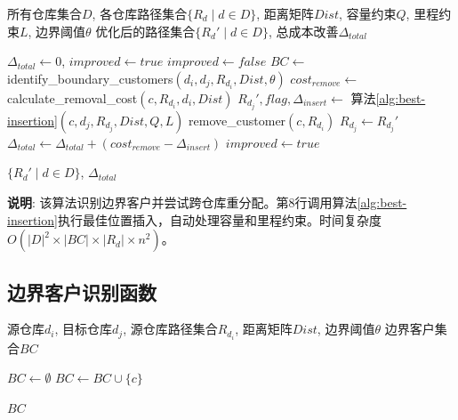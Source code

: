 \documentclass[12pt,a4paper]{article}
\begin{document}
\begin{algorithm}[H]
\caption{边界客户跨仓库重分配}
\label{alg:boundary-reassignment}
\begin{algorithmic}[1]
\REQUIRE 所有仓库集合$D$, 各仓库路径集合$\{R_d \mid d \in D\}$, 距离矩阵$Dist$, 容量约束$Q$, 里程约束$L$, 边界阈值$\theta$
\ENSURE 优化后的路径集合$\{R_d' \mid d \in D\}$, 总成本改善$\Delta_{total}$

\STATE $\Delta_{total} \gets 0$, $improved \gets true$
    \STATE $improved \gets false$
        \STATE $BC \gets$ identify\_boundary\_customers$(d_i, d_j, R_{d_i}, Dist, \theta)$  
            \STATE $cost_{remove} \gets$ calculate\_removal\_cost$(c, R_{d_i}, d_i, Dist)$  
            \STATE $R_{d_j}', flag, \Delta_{insert} \gets$ 算法\ref{alg:best-insertion}$(c, d_j, R_{d_j}, Dist, Q, L)$  
              
                \STATE remove\_customer$(c, R_{d_i})$  
                \STATE $R_{d_j} \gets R_{d_j}'$  
                \STATE $\Delta_{total} \gets \Delta_{total} + (cost_{remove} - \Delta_{insert})$
                \STATE $improved \gets true$
            \ENDIF
        \ENDFOR
    \ENDFOR
\ENDWHILE

\RETURN $\{R_d' \mid d \in D\}$, $\Delta_{total}$
\end{algorithmic}
\end{algorithm}

\textbf{说明}: 该算法识别边界客户并尝试跨仓库重分配。第8行调用算法\ref{alg:best-insertion}执行最佳位置插入，自动处理容量和里程约束。时间复杂度$O(|D|^2 \times |BC| \times |R_d| \times n^2)$。

\subsection{边界客户识别函数}

\begin{algorithm}[H]
\caption{识别边界客户}
\label{alg:identify-boundary}
\begin{algorithmic}[1]
\REQUIRE 源仓库$d_i$, 目标仓库$d_j$, 源仓库路径集合$R_{d_i}$, 距离矩阵$Dist$, 边界阈值$\theta$
\ENSURE 边界客户集合$BC$

\STATE $BC \gets \emptyset$
          
            \STATE $BC \gets BC \cup \{c\}$
        \ENDIF
    \ENDFOR
\ENDFOR

\RETURN $BC$
\end{algorithmic}
\end{algorithm}
\end{document}
